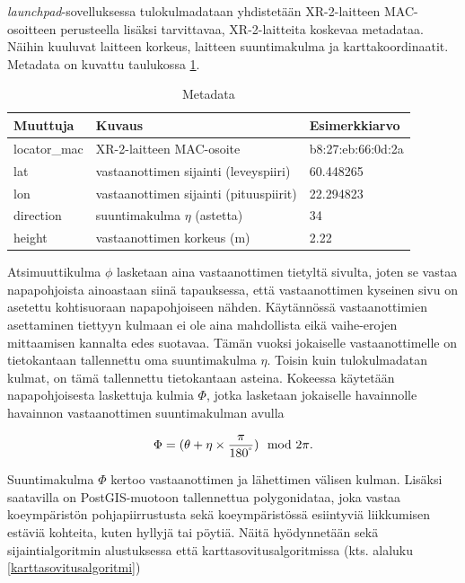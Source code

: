\documentclass[
  12pt,
  a4paper, twoside]{book}
\begin{document}
\emph{launchpad}-sovelluksessa tulokulmadataan yhdistetään XR-2-laitteen MAC-osoitteen perusteella lisäksi tarvittavaa, XR-2-laitteita koskevaa metadataa. Näihin kuuluvat laitteen korkeus, laitteen suuntimakulma ja karttakoordinaatit. Metadata on kuvattu taulukossa \ref{tab:metadata}.

\def\arraystretch{1.25} 
\begin{table}[H]
\centering
\begin{tabular}{|l|l|l|}
\hline
Muuttuja & Kuvaus & Esimerkkiarvo\\
\hline
locator\_mac & XR-2-laitteen MAC-osoite & b8:27:eb:66:0d:2a\\
lat & vastaanottimen sijainti (leveyspiiri) & 60.448265\\
lon & vastaanottimen sijainti (pituuspiirit) & 22.294823\\
direction & suuntimakulma $\eta$ (astetta) & 34\\
height & vastaanottimen korkeus (m) & 2.22 \\
\hline
\end{tabular}
\caption{Metadata}
\label{tab:metadata}
\end{table}

Atsimuuttikulma \(\phi\) lasketaan aina vastaanottimen tietyltä sivulta, joten se vastaa napapohjoista ainoastaan siinä tapauksessa, että vastaanottimen kyseinen sivu on asetettu kohtisuoraan napapohjoiseen nähden. Käytännössä vastaanottimien asettaminen tiettyyn kulmaan ei ole aina mahdollista eikä vaihe-erojen mittaamisen kannalta edes suotavaa. Tämän vuoksi jokaiselle vastaanottimelle on tietokantaan tallennettu oma suuntimakulma \(\eta\). Toisin kuin tulokulmadatan kulmat, on tämä tallennettu tietokantaan asteina. Kokeessa käytetään napapohjoisesta laskettuja kulmia \(\Phi\), jotka lasketaan jokaiselle havainnolle havainnon vastaanottimen suuntimakulman avulla

\begin{align}
\Phi=(\theta + \eta \times \frac{\pi}{180^\degree}) \mod 2 \pi.
\end{align}

Suuntimakulma \(\Phi\) kertoo vastaanottimen ja lähettimen välisen kulman. Lisäksi saatavilla on PostGIS-muotoon tallennettua polygonidataa, joka vastaa koeympäristön pohjapiirrustusta sekä koeympäristössä esiintyviä liikkumisen estäviä kohteita, kuten hyllyjä tai pöytiä. Näitä hyödynnetään sekä sijaintialgoritmin alustuksessa että karttasovitusalgoritmissa (kts. alaluku \ref{karttasovitusalgoritmi})
\end{document}

